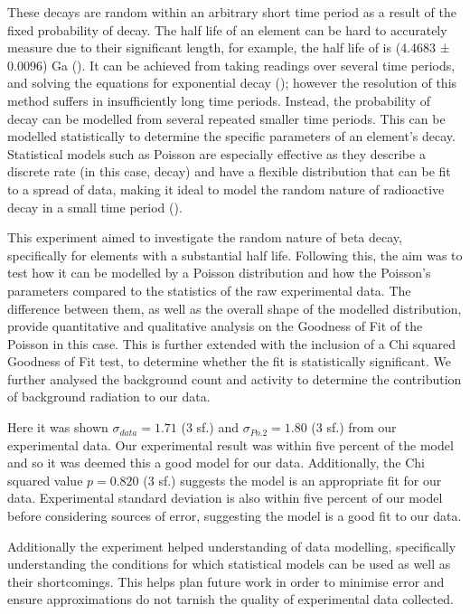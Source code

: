 \documentclass[11pt]{article}
\begin{document}
\noindent These decays are random within an arbitrary short time period as a result of the fixed probability of decay. The half life of an element can be hard to accurately measure due to their significant length, for example, the half life of  is (4.4683 ± 0.0096) Ga (\cite{U238}).  It can be achieved from taking readings over several time periods, and solving the equations for exponential decay (\cite{YF}); however the resolution of this method suffers in insufficiently long time periods. Instead, the probability of decay can be modelled from several repeated smaller time periods. This can be modelled statistically to determine the  specific parameters of an element's decay. Statistical models such as Poisson are especially effective as they describe a discrete rate (in this case, decay) and have a flexible distribution that can be fit to a spread of data, making it ideal to model the random nature of radioactive decay in a small time period (\cite{thompson2001poisson}). 
    
\noindent This experiment aimed to investigate the random nature of beta decay, specifically for elements with a substantial half life. Following this, the aim was to test how it can be modelled by a Poisson distribution and how the Poisson's parameters compared to the statistics of the raw experimental data. The difference between them, as well as the overall shape of the modelled distribution, provide quantitative and qualitative analysis on the Goodness of Fit of the Poisson in this case. This is further extended with the inclusion of a Chi squared Goodness of Fit test, to determine whether the fit is statistically significant.  We further analysed the background count and activity to determine the contribution of background radiation to our data. 
    
\noindent Here it was shown $\sigma_{data} = 1.71$ (3 sf.) and $\sigma_{Po.2} = 1.80$ (3 sf.) from our experimental data. Our experimental result was within five percent of the model and so it was deemed this a good model for our data. Additionally, the Chi squared value $p = 0.820$ (3 sf.) suggests the model is an appropriate fit for our data. Experimental standard deviation is also within five percent of our model before considering sources of error, suggesting the model is a good fit to our data. 
    
\noindent Additionally the experiment helped understanding of data modelling, specifically understanding the conditions for which statistical models can be used as well as their shortcomings. This helps plan future work in order to minimise error and ensure approximations do not tarnish the quality of experimental data collected.  
\end{document}
